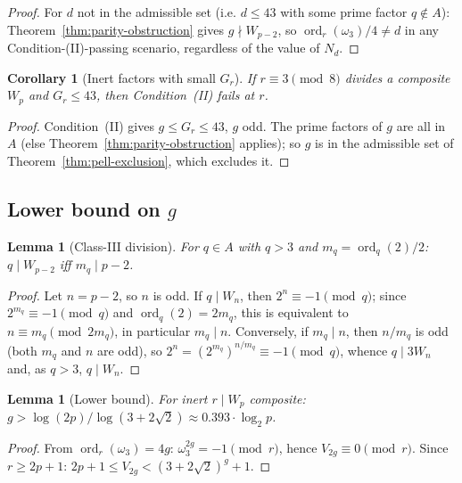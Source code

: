 \documentclass[11pt]{amsart}
\theoremstyle{plain}
\newtheorem{lemma}[theorem]{Lemma}
\newtheorem{corollary}[theorem]{Corollary}
\theoremstyle{definition}
\theoremstyle{remark}
\numberwithin{equation}{section}
\newcommand{\ord}{\operatorname{ord}}
\begin{document}
\begin{proof}
For $d$ not in the admissible set (i.e. $d \leq 43$ with some prime factor $q \notin A$): Theorem~\ref{thm:parity-obstruction} gives $g \nmid W_{p-2}$, so $\ord_r(\omega_3)/4 \neq d$ in any Condition-(II)-passing scenario, regardless of the value of $N_d$.
\end{proof}

\begin{corollary}[Inert factors with small $G_r$]\label{cor:small-Gr}
If $r \equiv 3 \pmod 8$ divides a composite $W_p$ and $G_r \leq 43$, then Condition~(II) fails at $r$.
\end{corollary}

\begin{proof}
Condition~(II) gives $g \leq G_r \leq 43$, $g$ odd. The prime factors of $g$ are all in $A$ (else Theorem~\ref{thm:parity-obstruction} applies); so $g$ is in the admissible set of Theorem~\ref{thm:pell-exclusion}, which excludes it.
\end{proof}

\subsection{Lower bound on \texorpdfstring{$g$}{g}}

\begin{lemma}[Class-III division]\label{lem:classIII-division}
For $q \in A$ with $q > 3$ and $m_q = \ord_q(2)/2$: $q \mid W_{p-2}$ iff $m_q \mid p - 2$.
\end{lemma}

\begin{proof}
Let $n=p-2$, so $n$ is odd. If $q \mid W_n$, then $2^n \equiv -1 \pmod q$; since $2^{m_q}\equiv -1 \pmod q$ and $\ord_q(2)=2m_q$, this is equivalent to $n \equiv m_q \pmod {2m_q}$, in particular $m_q\mid n$. Conversely, if $m_q\mid n$, then $n/m_q$ is odd (both $m_q$ and $n$ are odd), so $2^n=(2^{m_q})^{n/m_q}\equiv -1 \pmod q$, whence $q\mid 3W_n$ and, as $q>3$, $q\mid W_n$.
\end{proof}

\begin{lemma}[Lower bound]\label{lem:lower-bound}
For inert $r \mid W_p$ composite: $g > \log(2p)/\log(3 + 2\sqrt 2) \approx 0.393 \cdot \log_2 p$.
\end{lemma}

\begin{proof}
From $\ord_r(\omega_3) = 4g$: $\omega_3^{2g} = -1 \pmod r$, hence $V_{2g} \equiv 0 \pmod r$. Since $r \geq 2p + 1$: $2p + 1 \leq V_{2g} < (3 + 2\sqrt 2)^g + 1$.
\end{proof}
\end{document}
